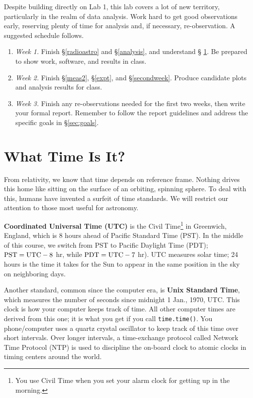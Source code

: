 \documentclass[11pt,preprint]{aastex}
\begin{document}
\noindent
Despite building directly on Lab 1, this lab covers a lot of new territory, particularly in the realm of data
analysis. Work hard to get good observations early, reserving plenty of
time for analysis and, if necessary, re-observation. A suggested schedule
follows.
\begin{enumerate}

\item {\it Week 1.}
Finish \S\ref{radioastro} and \S \ref{analysis}, and understand \S
  \ref{jultime}. Be prepared to show work, software, and results in class.

\item {\it Week 2.}
Finish \S \ref{meas2}, \S \ref{expt}, and \S \ref{secondweek}. Produce
candidate plots and analysis results for class.

\item {\it Week 3.} Finish any re-observations needed for the first
two weeks, then write your formal
  report. Remember to follow the report guidelines and address the specific
goals in \S\ref{sec:goals}.

\end{enumerate}


\section{What Time Is It?} \label{jultime}

\noindent
From relativity, we know that time depends on
reference frame. Nothing drives this home like sitting on the surface
of an orbiting, spinning sphere.
To deal with this, humans have invented a surfeit of time standards.
We will restrict our attention to those most useful for astronomy.

{\bf Coordinated Universal Time (UTC)} is the Civil Time\footnote{You use
  Civil Time when you set your alarm clock for getting up in the
  morning.} in Greenwich, England, which is 8 hours ahead of 
Pacific Standard Time (PST). In the middle of this course, we switch from
PST to Pacific Daylight Time (PDT); 
${\rm PST}={\rm UTC} - 8$ hr, while ${\rm PDT}={\rm UTC} - 7$ hr). UTC measures
solar time; 24 hours is the time it takes for the Sun to appear
in the same position in the sky on neighboring days.

Another standard, common since the computer era, is {\bf Unix Standard Time}, which measures the
number of seconds since midnight 1 Jan., 1970, UTC. 
This clock is how your computer keeps track of time. All other computer times
are derived from this one; it
is what you get if you call {\tt time.time()}.
You phone/computer uses a quartz crystal oscillator to keep track of 
this time over short intervals.  Over longer intervals, a time-exchange protocol called 
Network Time Protocol (NTP) is used to discipline the on-board clock to 
atomic clocks in timing centers around the world.
\end{document}
